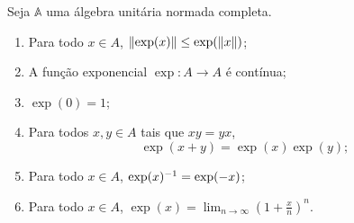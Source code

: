 \begin{proposition}
Seja $\mathbb A$ uma álgebra unitária normada completa.
	\begin{enumerate}
	\item Para todo $x \in A$, $\left\Vert{\exp(x)}\right\Vert \leq \exp(\left\Vert{x}\right\Vert)$;
	\item A função exponencial $\exp\colon A \to A$ é contínua;
	\item $\exp(0) = 1$;
	\item Para todos $x,y \in A$ tais que $xy=yx$,
		\begin{equation*}
		\exp(x+y) = \exp(x)\exp(y);
		\end{equation*}
	\item Para todo $x \in A$, $\exp(x)^{-1} = \exp(-x)$;
	\item Para todo $x \in A$, $\exp(x) = \lim_{n \to \infty} \left( 1 + \frac{x}{n} \right)^n$.
	\end{enumerate}
\end{proposition}
